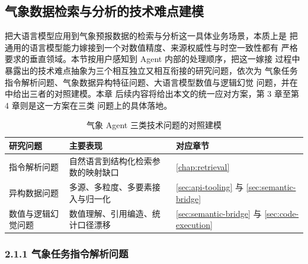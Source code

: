 
\subsection{气象数据检索与分析的技术难点建模}
\label{sec:problem-modeling}

把大语言模型应用到气象预报数据的检索与分析这一具体业务场景，本质上是
把通用的语言模型能力嫁接到一个对数值精度、来源权威性与时空一致性都有
严格要求的垂直领域。本节按用户感知到 Agent 内部的处理顺序，把这一嫁接
过程中暴露出的技术难点抽象为三个相互独立又相互衔接的研究问题，依次为
气象任务指令解析问题、气象数据异构特征问题、大语言模型数值与逻辑幻觉
问题，并在  中给出三者的对照建模。本章
后续内容将给出本文的统一应对方案，第 3 章至第 4 章则是这一方案在三类
问题上的具体落地。

\begin{table}[!ht]
    \centering
    \caption{气象 Agent 三类技术问题的对照建模}
    \label{tab:three-questions}
    \song\fontsize{9pt}{12pt}\selectfont
    \renewcommand{\arraystretch}{0.95}
    \begin{tabular}{lll}
        \toprule
        研究问题 & 主要表现 & 对应章节 \\
        \midrule
        指令解析问题 & 自然语言到结构化检索参数的映射缺口 & \ref{chap:retrieval} \\
        异构数据问题 & 多源、多粒度、多要素接入与归一化 & \ref{sec:api-tooling} 与 \ref{sec:semantic-bridge} \\
        数值与逻辑幻觉问题 & 数值理解、引用编造、统计口径漂移 & \ref{sec:semantic-bridge} 与 \ref{sec:code-execution} \\
        \bottomrule
    \end{tabular}
\end{table}

\subsubsection*{2.1.1 \quad 气象任务指令解析问题}

